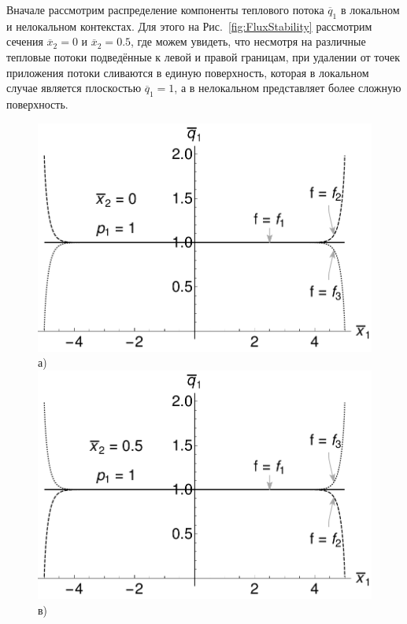 Вначале рассмотрим распределение компоненты теплового потока $\overline{q}_1$ в локальном и нелокальном контекстах. Для этого на Рис.~\ref{fig:FluxStability} рассмотрим сечения $\overline{x}_2 = 0$ и $\overline{x}_2 = 0.5$, где можем увидеть, что несмотря на различные тепловые потоки подведённые к левой и правой границам, при удалении от точек приложения потоки сливаются в единую поверхность, которая в локальном случае является плоскостью $\overline{q}_1 = 1$, а в нелокальном представляет более сложную поверхность.

\begin{figure}[ht]
    \begin{minipage}[b][][b]{0.49\linewidth}\centering
        \includegraphics[width=\linewidth]{pics/FluxStabilityX0P1.pdf} \\ а)
        \includegraphics[width=\linewidth]{pics/FluxStabilityX05P1.pdf} \\ в)

\end{minipage}
\end{figure}
